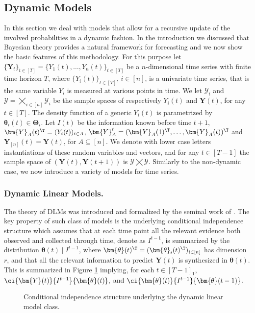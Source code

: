 \subsection{Dynamic Models}
\label{sec:dynmod}
In this section we deal with models that allow for a recursive update of the involved probabilities in a dynamic fashion. In the introduction we discussed that Bayesian theory provides a natural framework for forecasting and we now show the basic features of this methodology. For this purpose let $\{\bm{Y}_t\}_{t\in[T]}=\{Y_1(t),\dots, Y_n(t)\}_{t\in[T]}$ be a $n$-dimensional time series with finite time horizon $T$, where $\{Y_i(t)\}_{t\in[T]}$, $i\in[n]$, is a univariate time series, that is the same variable $Y_i$ is measured at various points in time. We let $\mathcal{Y}_i$ and $\bm{\mathcal{Y}}=\bigtimes_{i\in[n]}\mathcal{Y}_i$ be the sample spaces of respectively $Y_i(t)$ and $\bm{Y}(t)$, for any $t\in[T]$. The density function of a generic $Y_i(t)$ is parametrized by  $\bm{\theta}_i(t)\in\bm{\Theta}_i$. Let $I(t)$ be the information known before time $t+1$, $\bm{Y}_A(t)^\T=(Y_i(t))_{i\in A}$, $\bm{Y}_A^t=(\bm{Y}_A(1)^\T,\dots,\bm{Y}_A(t) )^\T$ and $\bm{Y}_{[n]}(t)=\bm{Y}(t)$, for $A\subseteq[n]$. We denote with lower case letters instantiations of these random variables and vectors, and for any $t\in[T-1]$ the sample space of $(\bm{Y}(t),\bm{Y}(t+1))$ is $\bm{\mathcal{Y}}\bigtimes \bm{\mathcal{Y}}$. Similarly to the non-dynamic case, we now introduce a variety of models for time series. 

\subsubsection{Dynamic Linear Models.}
\label{sec:DLM}
The theory of \glspl{DLM} was introduced and formalized by the seminal work of \citet{Harrison1997}. The key property of such class of models is the underlying conditional independence structure which assumes that at each time point all the relevant evidence both observed and collected through time, denote as  $I^{t-1}$, is summarized by the distribution $\bm{\theta}(t)\;|\;I^{t-1}$, where $\bm{\theta}(t)^\T=(\bm{\theta}_i(t)^\T)_{i\in[n]}$ has dimension $r$, and that all the relevant information to predict $\bm{Y}(t)$ is synthesized in $\bm{\theta}(t)$. This is summarized in Figure \ref{fig:CIDLM} implying, for each $t\in [T-1]_1$, $
\ci{\bm{Y}(t)}{I^{t-1}}{\bm{\theta}(t)},$ and  $\ci{\bm{\theta}(t)}{I^{t-1}}{\bm{\theta}(t-1)}$.
 
\begin{figure}
\centerline{
}
\caption{Conditional independence structure underlying the dynamic linear model class. \label{fig:CIDLM}}
\end{figure} 

